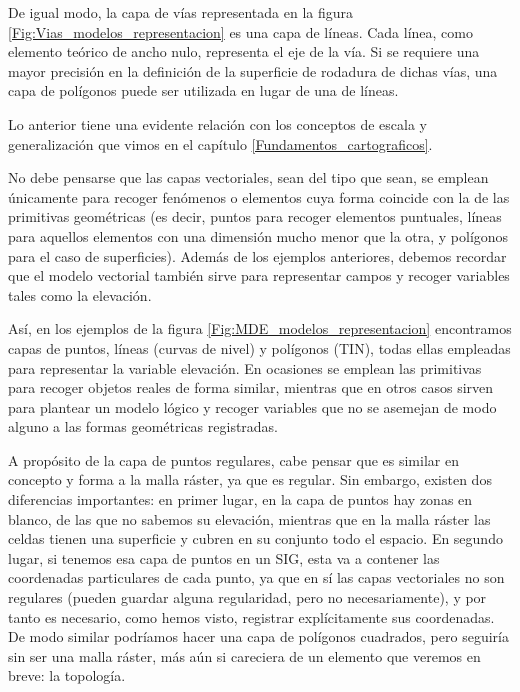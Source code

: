 \begin{multicols}{2}
De igual modo, la capa de vías representada en la figura \ref{Fig:Vias_modelos_representacion} es una capa de líneas. Cada línea, como elemento teórico de ancho nulo, representa el eje de la vía. Si se requiere una mayor precisión en la definición de la superficie de rodadura de dichas vías, una capa de polígonos puede ser utilizada en lugar de una de líneas.

Lo anterior tiene una evidente relación con los conceptos de escala y generalización que vimos en el capítulo \ref{Fundamentos_cartograficos}.

No debe pensarse que las capas vectoriales, sean del tipo que sean, se emplean únicamente para recoger fenómenos o elementos cuya forma coincide con la de las primitivas geométricas (es decir, puntos para recoger elementos puntuales, líneas para aquellos elementos con una dimensión mucho menor que la otra, y polígonos para el caso de superficies). Además de los ejemplos anteriores, debemos recordar que el modelo vectorial también sirve para representar campos y recoger variables tales como la elevación.

Así, en los ejemplos de la figura \ref{Fig:MDE_modelos_representacion} encontramos capas de puntos, líneas (curvas de nivel) y polígonos (TIN), todas ellas empleadas para representar la variable elevación. En ocasiones se emplean las primitivas para recoger objetos reales de forma similar, mientras que en otros casos sirven para plantear un modelo lógico y recoger variables que no se asemejan de modo alguno a las formas geométricas registradas.

A propósito de la capa de puntos regulares, cabe pensar que es similar en concepto y forma a la malla ráster, ya que es regular. Sin embargo, existen dos diferencias importantes: en primer lugar, en la capa de puntos hay zonas en blanco, de las que no sabemos su elevación, mientras que en la malla ráster las celdas tienen una superficie y cubren en su conjunto todo el espacio. En segundo lugar, si tenemos esa capa de puntos en un SIG, esta va a contener las coordenadas particulares de cada punto, ya que en sí las capas vectoriales no son regulares (pueden guardar alguna regularidad, pero no necesariamente), y por tanto es necesario, como hemos visto, registrar explícitamente sus coordenadas. De modo similar podríamos hacer una capa de polígonos cuadrados, pero seguiría sin ser una malla ráster, más aún si careciera de un elemento que veremos en breve: la topología. 


\end{multicols}
